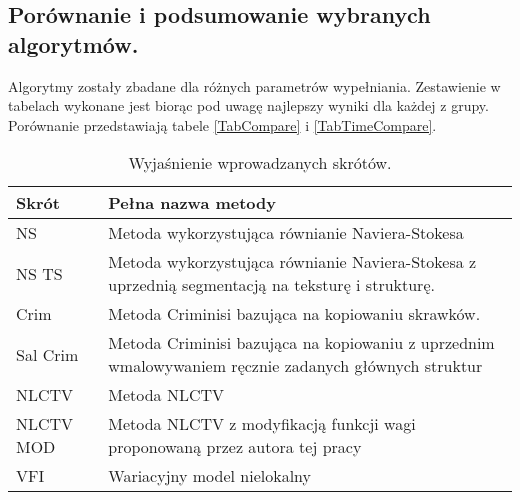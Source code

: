 \documentclass[12pt, twoside, openany]{report}
\theoremstyle{definition}
\begin{document}
\subsection{Porównanie i podsumowanie wybranych algorytmów.}
Algorytmy zostały zbadane dla różnych parametrów wypełniania. Zestawienie w tabelach wykonane jest biorąc pod uwagę najlepszy wyniki dla każdej z grupy. Porównanie przedstawiają tabele \ref{TabCompare} i \ref{TabTimeCompare}.
\newpage
\begin{table}[!h]
    \centering
    \begin{tabular}{|p{4cm}|p{9cm}|}
        \hline
         Skrót & Pełna nazwa metody \\ \hline \hline
         NS    & Metoda wykorzystująca równianie Naviera-Stokesa \\ \hline
         NS TS    & Metoda wykorzystująca równianie Naviera-Stokesa z uprzednią segmentacją na teksturę i strukturę. \\ \hline
         Crim    & Metoda Criminisi bazująca na kopiowaniu skrawków. \\ \hline
         Sal Crim    & Metoda Criminisi bazująca na kopiowaniu z uprzednim wmalowywaniem ręcznie zadanych głównych struktur \\ \hline
         NLCTV    & Metoda NLCTV \\ \hline
         NLCTV MOD   & Metoda NLCTV z modyfikacją funkcji wagi proponowaną przez autora tej pracy \\ \hline
         VFI   & Wariacyjny model nielokalny \\ \hline
    \end{tabular}
    \caption{Wyjaśnienie wprowadzanych skrótów.}
\end{table}
\end{document}
